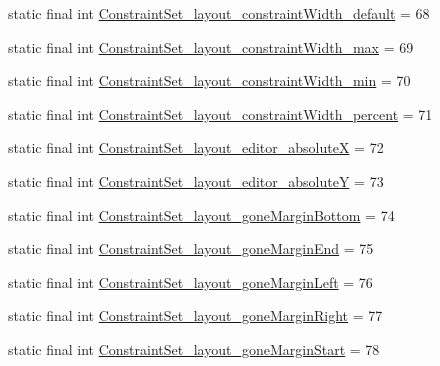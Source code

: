 \begin{DoxyCompactItemize}
\item 
static final int \mbox{\hyperlink{classandroid_1_1support_1_1constraint_1_1_r_1_1styleable_a9d0bfb012bf348905558f072fd1a0dae}{Constraint\+Set\+\_\+layout\+\_\+constraint\+Width\+\_\+default}} = 68
\item 
static final int \mbox{\hyperlink{classandroid_1_1support_1_1constraint_1_1_r_1_1styleable_ac2a03f82c58a968cc73c7c335bb879fb}{Constraint\+Set\+\_\+layout\+\_\+constraint\+Width\+\_\+max}} = 69
\item 
static final int \mbox{\hyperlink{classandroid_1_1support_1_1constraint_1_1_r_1_1styleable_af15994ec10223ae13d190636a17ca11d}{Constraint\+Set\+\_\+layout\+\_\+constraint\+Width\+\_\+min}} = 70
\item 
static final int \mbox{\hyperlink{classandroid_1_1support_1_1constraint_1_1_r_1_1styleable_a28aa1aec891394e2ee04bf02859fdc72}{Constraint\+Set\+\_\+layout\+\_\+constraint\+Width\+\_\+percent}} = 71
\item 
static final int \mbox{\hyperlink{classandroid_1_1support_1_1constraint_1_1_r_1_1styleable_a74eece3f74f9b7e9e0649dcee1979a53}{Constraint\+Set\+\_\+layout\+\_\+editor\+\_\+absoluteX}} = 72
\item 
static final int \mbox{\hyperlink{classandroid_1_1support_1_1constraint_1_1_r_1_1styleable_a532538838976eae8a9e64f433260c409}{Constraint\+Set\+\_\+layout\+\_\+editor\+\_\+absoluteY}} = 73
\item 
static final int \mbox{\hyperlink{classandroid_1_1support_1_1constraint_1_1_r_1_1styleable_a753460c26fea8c22a136b940ddcdb73f}{Constraint\+Set\+\_\+layout\+\_\+gone\+Margin\+Bottom}} = 74
\item 
static final int \mbox{\hyperlink{classandroid_1_1support_1_1constraint_1_1_r_1_1styleable_a7081428f7c0e16e4db274a90994c7954}{Constraint\+Set\+\_\+layout\+\_\+gone\+Margin\+End}} = 75
\item 
static final int \mbox{\hyperlink{classandroid_1_1support_1_1constraint_1_1_r_1_1styleable_ac433508e7b3a909da54b75327b7c3740}{Constraint\+Set\+\_\+layout\+\_\+gone\+Margin\+Left}} = 76
\item 
static final int \mbox{\hyperlink{classandroid_1_1support_1_1constraint_1_1_r_1_1styleable_a483f89ba0a9f1556201f84cc11fa3deb}{Constraint\+Set\+\_\+layout\+\_\+gone\+Margin\+Right}} = 77
\item 
static final int \mbox{\hyperlink{classandroid_1_1support_1_1constraint_1_1_r_1_1styleable_ae5cd1a96c0f9235a4b411dcf6df9497f}{Constraint\+Set\+\_\+layout\+\_\+gone\+Margin\+Start}} = 78

\end{DoxyCompactItemize}
